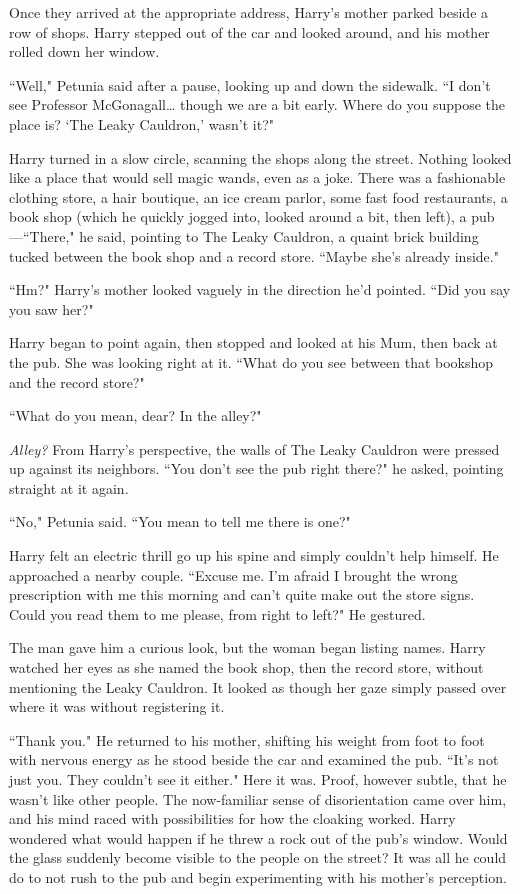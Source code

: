 Once they arrived at the appropriate address, Harry's
mother parked beside a row of shops. Harry stepped out
of the car and looked around, and his mother rolled down
her window.

``Well," Petunia said after a pause, looking up and down
the sidewalk. ``I don't see Professor McGonagall{\ldots} though
we are a bit early. Where do you suppose the place is?
`The Leaky Cauldron,' wasn't it?"

Harry turned in a slow circle, scanning the shops along the
street. Nothing looked like a place that would sell magic
wands, even as a joke. There was a fashionable clothing
store, a hair boutique, an ice cream parlor, some fast food
restaurants, a book shop (which he quickly jogged into,
looked around a bit, then left), a pub---``There," he said,
pointing to The Leaky Cauldron, a quaint brick building
tucked between the book shop and a record store. ``Maybe
she's already inside."

``Hm?" Harry's mother looked vaguely in the direction he'd
pointed. ``Did you say you saw her?"

Harry began to point again, then stopped and looked at
his Mum, then back at the pub. She was looking right at
it. ``What do you see between that bookshop and the
record store?"

``What do you mean, dear? In the alley?"

\emph{Alley?} From Harry's perspective, the walls of The Leaky
Cauldron were pressed up against its neighbors. ``You don't
see the pub right there?" he asked, pointing straight at it
again.

``No," Petunia said. ``You mean to tell me there is one?"

Harry felt an electric thrill go up his spine and simply
couldn't help himself. He approached a nearby couple.
``Excuse me. I'm afraid I brought
the wrong prescription with me this morning and can't
quite make out the store signs. Could you read them to
me please, from right to left?" He gestured.

The man gave him a curious look, but the woman began
listing names. Harry watched her eyes as she named the
book shop, then the record store, without mentioning the
Leaky Cauldron. It looked as though her gaze simply
passed over where it was without registering it.

``Thank you." He returned to his mother, shifting his weight
from foot to foot with nervous energy as he stood beside
the car and examined the pub. ``It's not just you. They
couldn't see it either." Here it was. Proof, however subtle,
that he wasn't like other people. The now-familiar sense of
disorientation came over him, and his mind raced with
possibilities for how the cloaking worked. Harry wondered
what would happen if he threw a rock out of the pub's
window. Would the glass suddenly become visible to the
people on the street? It was all he could do to not rush
to the pub and begin experimenting with his mother's
perception.

